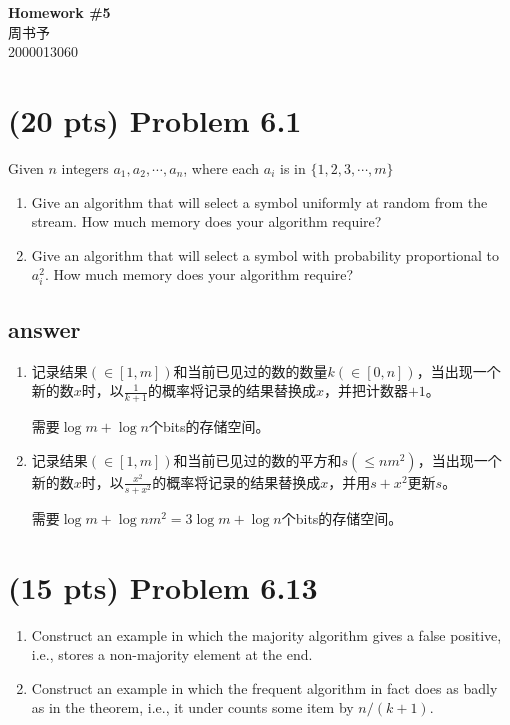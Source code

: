 \documentclass[12pt]{article}
\newcommand{\hwid}{5}			%
\newcommand{\name}{周书予} 		%
\newcommand{\id}{2000013060} 	%
\begin{document}
    \pagestyle{fancy}
    \chead{}

    \begin{center}
        {\LARGE \bf Homework \#\hwid}\\
        {\Large \name}\\
        {\Large \id}\\
    \end{center}
    
 \section{(20 pts) Problem 6.1}
    Given $n$ integers $a_1,a_2,\cdots,a_n$, where each $a_i$ is in $\{1,2,3,\cdots,m\}$
    \begin{enumerate}
        \item Give an algorithm that will select a symbol uniformly at random from the stream. How much memory does your algorithm require?
        \item Give an algorithm that will select a symbol with probability proportional to $a_i^2$. How much memory does your algorithm require?
    \end{enumerate}
\subsection*{answer}
	\begin{enumerate}
		\item 记录结果$(\in [1, m])$和当前已见过的数的数量$k(\in [0, n])$，当出现一个新的数$x$时，以$\frac{1}{k + 1}$的概率将记录的结果替换成$x$，并把计数器$+1$。
		
		需要$\log m + \log n$个bits的存储空间。
		\item 记录结果$(\in [1, m])$和当前已见过的数的平方和$s(\le nm^2)$，当出现一个新的数$x$时，以$\frac{x^2}{s + x^2}$的概率将记录的结果替换成$x$，并用$s + x^2$更新$s$。
		
		需要$\log m + \log nm^2 = 3\log m + \log n$个bits的存储空间。
	\end{enumerate}
\section{(15 pts) Problem 6.13}
\begin{enumerate}
    \item 
    Construct an example in which the majority algorithm gives a false positive, i.e., stores a non-majority element at the end.
    \item
    Construct an example in which the frequent algorithm in fact does as badly as in the theorem, i.e., it under counts some item by $n/(k+1)$.
\end{enumerate}
\end{document}
